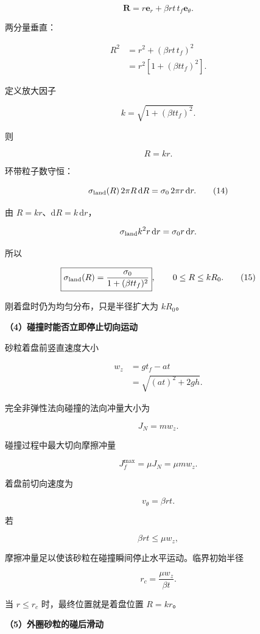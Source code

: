 \documentclass[12pt,a4paper,UTF8]{ctexart}
\begin{document}
\[
\bm R
=r\bm e_r+\beta rt\,t_f\bm e_\theta.
\tag{11}
\]

两分量垂直：

\[
\begin{aligned}
R^2
&=r^2+(\beta rt\,t_f)^2\\
&=r^2\left[1+(\beta tt_f)^2\right].
\end{aligned}
\]

定义放大因子

\[
k=\sqrt{1+(\beta tt_f)^2}.
\tag{12}
\]

则

\[
R=kr.
\tag{13}
\]

环带粒子数守恒：

\[
\sigma_{\rm land}(R)\,2\pi R\,\mathrm dR
=\sigma_0\,2\pi r\,\mathrm dr.
\tag{14}
\]

由 \(R=kr\)、\(\mathrm dR=k\,\mathrm dr\)，

\[
\sigma_{\rm land}k^2r\,\mathrm dr
=\sigma_0r\,\mathrm dr.
\]

所以

\[
\boxed{
\sigma_{\rm land}(R)
=\frac{\sigma_0}
{1+(\beta tt_f)^2}
},
\qquad
0\leq R\leq kR_0.
\tag{15}
\]

刚着盘时仍为均匀分布，只是半径扩大为 \(kR_0\)。

\textbf{（4）碰撞时能否立即停止切向运动}

砂粒着盘前竖直速度大小

\[
\begin{aligned}
w_z
&=gt_f-at\\
&=\sqrt{(at)^2+2gh}.
\end{aligned}
\tag{16}
\]

完全非弹性法向碰撞的法向冲量大小为

\[
J_N=mw_z.
\tag{17}
\]

碰撞过程中最大切向摩擦冲量

\[
J_f^{\max}=\mu J_N=\mu mw_z.
\tag{18}
\]

着盘前切向速度为

\[
v_\theta=\beta rt.
\tag{19}
\]

若

\[
\beta rt\leq\mu w_z,
\tag{20}
\]

摩擦冲量足以使该砂粒在碰撞瞬间停止水平运动。临界初始半径

\[
\boxed{
r_c=\frac{\mu w_z}{\beta t}
}.
\tag{21}
\]

当 \(r\leq r_c\) 时，最终位置就是着盘位置 \(R=kr\)。

\textbf{（5）外圈砂粒的碰后滑动}
\end{document}
